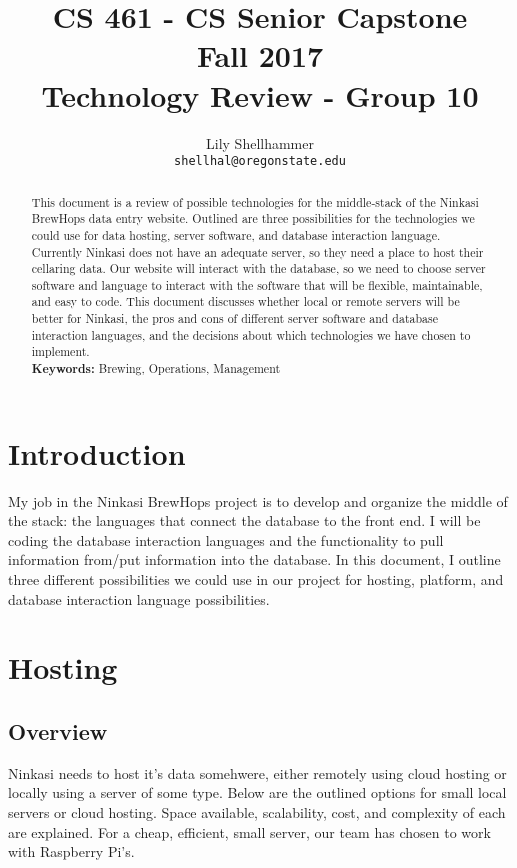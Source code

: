 \documentclass[draftclsnofoot,onecolumn,letterpaper,10pt,compsoc]{IEEEtran}
\title{CS 461 - CS Senior Capstone
	\\Fall 2017
	\\Technology Review - Group 10
}
\author{
	Lily Shellhammer \\
	\texttt{shellhal@oregonstate.edu}
}
\begin{document}
\begin{titlingpage}
    \maketitle
    \begin{abstract}
		This document is a review of possible technologies for the middle-stack of the Ninkasi BrewHops data entry website.
		Outlined are three possibilities for the technologies we could use for data hosting, server software, and database interaction language.
		Currently Ninkasi does not have an adequate server, so they need a place to host their cellaring data. Our website will interact with the database, so we need to choose server software and language to interact with the software that will be flexible, maintainable, and easy to code.
		This document discusses whether local or remote servers will be better for Ninkasi, the pros and cons of different server software and database interaction languages, and the decisions about which technologies we have chosen to implement.
			\\
      \textbf{Keywords:} Brewing, Operations, Management
    \end{abstract}
		\pagebreak
		\tableofcontents
\end{titlingpage}

\section{Introduction}
My job in the Ninkasi BrewHops project is to develop and organize the middle of the stack: the languages that connect the database to the front end.
I will be coding the database interaction languages and the functionality to pull information from/put information into the database.
In this document, I outline three different possibilities we could use in our project for hosting, platform, and database interaction language possibilities.

\section{Hosting}
    \subsection{Overview}
		Ninkasi needs to host it's data somehwere, either remotely using cloud hosting or locally using a server of some type.
		Below are the outlined options for small local servers or cloud hosting.
		Space available, scalability, cost, and complexity of each are explained.
		For a cheap, efficient, small server, our team has chosen to work with Raspberry Pi's.
\end{document}
